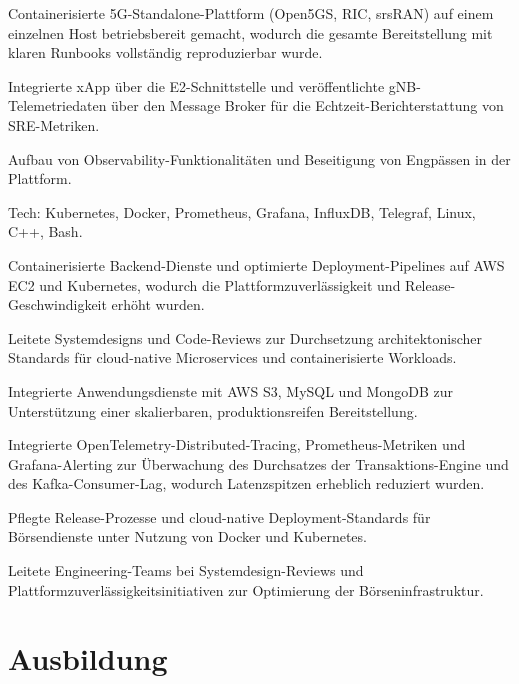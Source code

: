\documentclass[10pt,a4paper]{resume}
\begin{document}
\bullets
  \item Containerisierte 5G-Standalone-Plattform (Open5GS, RIC, srsRAN) auf einem einzelnen Host betriebsbereit gemacht, wodurch die gesamte Bereitstellung mit klaren Runbooks vollständig reproduzierbar wurde.
  \item Integrierte xApp über die E2-Schnittstelle und veröffentlichte gNB-Telemetriedaten über den Message Broker für die Echtzeit-Berichterstattung von SRE-Metriken.
  \item Aufbau von Observability-Funktionalitäten und Beseitigung von Engpässen in der Plattform.
  \item Tech: Kubernetes, Docker, Prometheus, Grafana, InfluxDB, Telegraf, Linux, C++, Bash.
\bulletsend
\vspace{1.5pt}
\bullets
  \item Containerisierte Backend-Dienste und optimierte Deployment-Pipelines auf AWS EC2 und Kubernetes, wodurch die Plattformzuverlässigkeit und Release-Geschwindigkeit erhöht wurden.
  \item Leitete Systemdesigns und Code-Reviews zur Durchsetzung architektonischer Standards für cloud-native Microservices und containerisierte Workloads.
  \item Integrierte Anwendungsdienste mit AWS S3, MySQL und MongoDB zur Unterstützung einer skalierbaren, produktionsreifen Bereitstellung.
\bulletsend
\vspace{1.5pt}
\bullets
  \item Integrierte OpenTelemetry-Distributed-Tracing, Prometheus-Metriken und Grafana-Alerting zur Überwachung des Durchsatzes der Transaktions-Engine und des Kafka-Consumer-Lag, wodurch Latenzspitzen erheblich reduziert wurden.
  \item Pflegte Release-Prozesse und cloud-native Deployment-Standards für Börsendienste unter Nutzung von Docker und Kubernetes.
  \item Leitete Engineering-Teams bei Systemdesign-Reviews und Plattformzuverlässigkeitsinitiativen zur Optimierung der Börseninfrastruktur.
\bulletsend
\vspace{1.5pt}

\section{Ausbildung}
\end{document}
